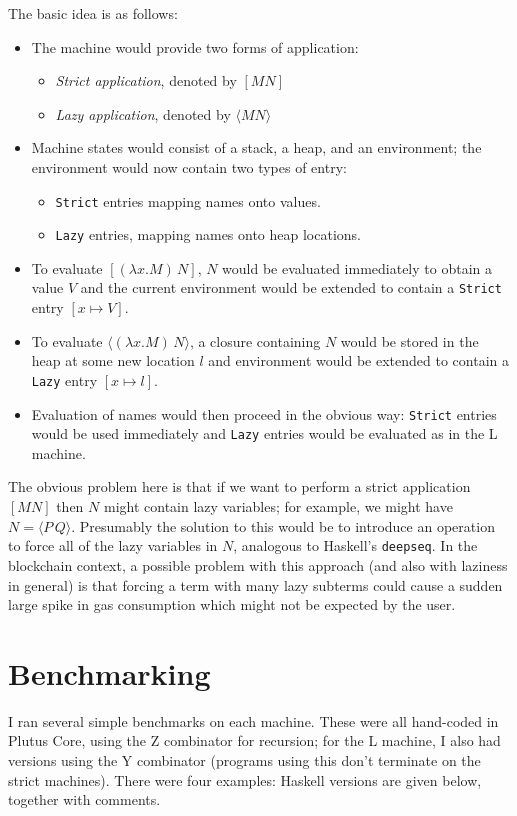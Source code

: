 \documentclass[a4paper]{article}
\begin{document}
\noindent The basic idea is as follows:
\begin{itemize}
\item The machine would provide two forms of application:
  \begin{itemize}
  \item \textit{Strict application}, denoted by $[M N]$
  \item \textit{Lazy application}, denoted by $\langle M N \rangle$
  \end{itemize}
  \item Machine states would consist of a stack, a heap, and an environment;
    the environment would now contain two types of entry:
  \begin{itemize}
  \item \texttt{Strict} entries mapping names onto values.
  \item \texttt{Lazy} entries, mapping names onto heap locations.
  \end{itemize}
  \item To evaluate $[(\lambda x.M)\, N]$, $N$ would be evaluated immediately
    to obtain a value $V$ and the current environment would be extended to
    contain a \texttt{Strict} entry $[x \mapsto V]$.
  \item To evaluate $\langle (\lambda x.M)\, N \rangle$, a closure
    containing $N$ would be stored in the heap at some new location
    $l$ and environment would be extended to contain a \texttt{Lazy}
    entry $[x \mapsto l]$.
  \item Evaluation of names would then proceed in the obvious way:
    \texttt{Strict} entries would be used immediately and \texttt{Lazy}
    entries would be evaluated as in the L machine.
\end{itemize}


\noindent The obvious problem here is that if we want to perform a
strict application $[M N]$ then $N$ might contain lazy variables; for
example, we might have $N = \langle P\, Q \rangle$.  Presumably the
solution to this would be to introduce an operation to force all of
the lazy variables in $N$, analogous to Haskell's \texttt{deepseq}.
In the blockchain context, a possible problem with this approach (and
also with laziness in general) is that forcing a term with many lazy
subterms could cause a sudden large spike in gas consumption which
might not be expected by the user.




\section{Benchmarking}\label{sec:benchmarks}
I ran several simple benchmarks on each machine. These were all hand-coded
in Plutus Core, using the Z combinator for recursion; for the L machine, I also
had versions using the Y combinator (programs using this don't terminate on the 
strict machines).  There were four examples: Haskell versions are given below, 
together with comments.
\end{document}
